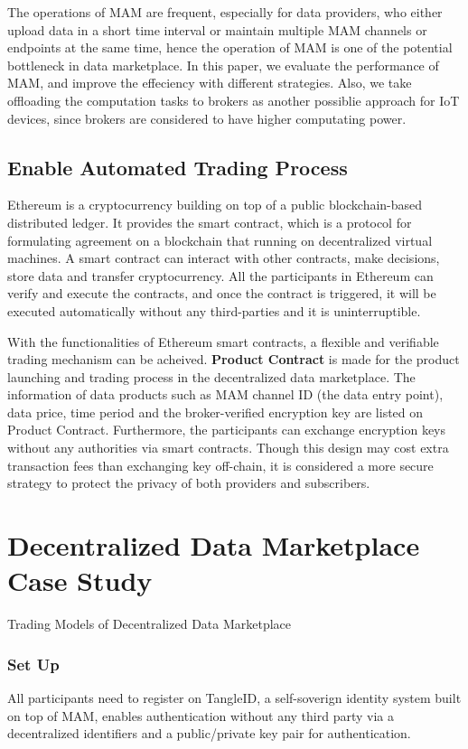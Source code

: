 \documentclass[conference]{IEEEtran}
\begin{document}
The operations of MAM are frequent, especially for data providers, who either upload data in a short time interval or maintain multiple MAM channels or endpoints at the same time, hence the operation of MAM is one of the potential bottleneck in data marketplace. In this paper, we evaluate the performance of MAM, and improve the effeciency with different strategies. Also, we take offloading the computation tasks to brokers as another possiblie approach for IoT devices, since brokers are considered to have higher computating power.


\subsection{Enable Automated Trading Process}
Ethereum is a cryptocurrency building on top of a public blockchain-based distributed ledger. 
It provides the smart contract, which is a protocol for formulating agreement on a blockchain that running on decentralized virtual machines. A smart contract can interact with other contracts, make decisions, store data and transfer cryptocurrency. All the participants in Ethereum can verify and execute the contracts, and once the contract is triggered, it will be executed automatically without any third-parties and it is uninterruptible. 

With the functionalities of Ethereum smart contracts, a flexible and verifiable trading mechanism can be acheived. \textbf{Product Contract} is made for the product launching and trading process in the decentralized data marketplace. The information of data products such as MAM channel ID (the data entry point), data price, time period and the broker-verified encryption key are listed on Product Contract. Furthermore, the participants can exchange encryption keys without any authorities via smart contracts. Though this design may cost extra transaction fees than exchanging key off-chain, it is considered a more secure strategy to protect the privacy of both providers and subscribers.


\section{Decentralized Data Marketplace Case Study}
Trading Models of Decentralized Data Marketplace
\subsubsection{Set Up}
All participants need to register on TangleID\cite{TangleID}, a self-soverign identity system built on top of MAM, enables authentication without any third party via a decentralized identifiers and a public/private key pair for authentication. 
\end{document}
